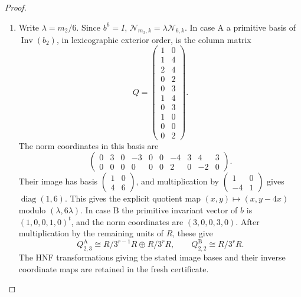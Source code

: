 \documentclass[11pt,a4paper]{article}
\theoremstyle{definition}
\begin{document}
\begin{proof}
\begin{enumerate}[label=\arabic*.]
The actual covering map on the horizontal term of the Wang
sequence is the norm
\[
 \mathcal N_{m_2,k}=\sum_{j=0}^{m_2-1}b_k^j:
 \operatorname{coker}(b_k-I)\longrightarrow\operatorname{Inv}(b_k).
\]
Indeed, the lift is the union of the $m_2$ successive prisms
with their transported coefficients.  On the vertical invariant
quotient pullback is the identity.  Consequently horizontal
inclusion induces the actual isomorphism
\[
 \frac{\operatorname{Inv}(b_{q-1})}
      {\mathcal N_{m_2,q-1}\bigwedge^{q-1}R^5}
 \ \xrightarrow{\ \sim\ }\
 \frac{\operatorname{Inv}(\bigwedge^q V_R)}{J_{2,q}}.
\]
Surjectivity follows by subtracting a restriction with the same
vertical component; its kernel is exactly the horizontal norm
image.  Thus no choice of a Wang splitting changes this quotient.

\item Write $\lambda=m_2/6$.  Since $b^6=I$,
$\mathcal N_{m_2,k}=\lambda\mathcal N_{6,k}$.
In case A a primitive basis of $\operatorname{Inv}(b_2)$,
in lexicographic exterior order, is the column matrix
\[
 Q=\begin{pmatrix}
 1&0\\1&4\\2&4\\0&2\\0&3\\1&4\\0&3\\1&0\\0&0\\0&2
 \end{pmatrix}.
\]
The norm coordinates in this basis are
\[
 \begin{pmatrix}
 0&3&0&-3&0&0&-4&3&4&3\\
 0&0&0&0&0&0&2&0&-2&0
 \end{pmatrix}.
\]
Their image has basis $\left(\begin{smallmatrix}1&0\\4&6\end{smallmatrix}\right)$,
and multiplication by
$\left(\begin{smallmatrix}1&0\\-4&1\end{smallmatrix}\right)$
gives $\operatorname{diag}(1,6)$.  This gives the explicit quotient
map $(x,y)\mapsto(x,y-4x)$ modulo $(\lambda,6\lambda)$.
In case B the primitive invariant vector of $b$ is
$(1,0,0,1,0)^t$, and the norm coordinates are $(3,0,0,3,0)$.
After multiplication by the remaining units of $R$, these give
\[
 Q_{2,3}^{\mathrm A}\cong R/3^{r-1}R\oplus R/3^rR,
 \qquad Q_{2,2}^{\mathrm B}\cong R/3^rR.
\]
The HNF transformations giving the stated image bases and their
inverse coordinate maps are retained in the fresh certificate.


\end{enumerate}
\end{proof}
\end{document}
